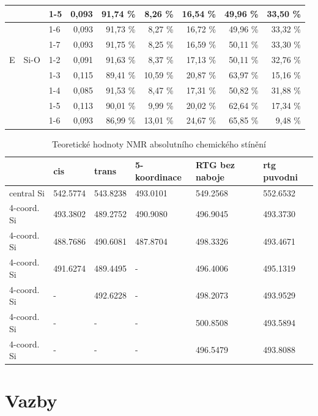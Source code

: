 \documentclass[
  digital, %
  table,   %
  lof,     %
  lot,     %
  oneside,
]{fithesis3}
\begin{document}
\begin{table}[htbp]
\begin{center}
\begin{tabular}{|l|l|l|r|r|r|r|r|r|}
 &  & 1-5  & 0,093 & 91,74 \% & 8,26 \% & 16,54 \% & 49,96 \% & 33,50 \% \\ \hline
 &  & 1-6 & 0,093 & 91,73 \% & 8,27 \% & 16,72 \% & 49,96 \% & 33,32 \% \\ \hline
 &  & 1-7 & 0,093 & 91,75 \% & 8,25 \% & 16,59 \% & 50,11 \% & 33,30 \% \\ \hline
E & Si-O & 1-2  & 0,091 & 91,63 \% & 8,37 \% & 17,13 \% & 50,11 \% & 32,76 \% \\ \hline
 &  & 1-3  & 0,115 & 89,41 \% & 10,59 \% & 20,87 \% & 63,97 \% & 15,16 \% \\ \hline
 &  & 1-4  & 0,085 & 91,53 \% & 8,47 \% & 17,31 \% & 50,82 \% & 31,88 \% \\ \hline
 &  & 1-5  & 0,113 & 90,01 \% & 9,99 \% & 20,02 \% & 62,64 \% & 17,34 \% \\ \hline
 &  & 1-6 & 0,093 & 86,99 \% & 13,01 \% & 24,67 \% & 65,85 \% & 9,48 \% \\ \hline
\end{tabular}
\end{center}
\label{nbo_large}
\end{table}

\begin{table}[htbp]
\caption{Teoretické hodnoty NMR absolutního chemického stínění}
\begin{center}
\begin{tabular}{|l|l|l|l|l|l|}
\hline
 & cis & trans & 5-koordinace & RTG bez naboje & rtg puvodni \\ \hline
central Si & 542.5774 & 543.8238 & 493.0101 & 549.2568 & 552.6532 \\ \hline
4-coord. Si & 493.3802 & 489.2752 & 490.9080 & 496.9045 & 493.3730 \\ \hline
4-coord. Si & 488.7686 & 490.6081 & 487.8704 & 498.3326 & 493.4671 \\ \hline
4-coord. Si & 491.6274 & 489.4495 & - & 496.4006 & 495.1319 \\ \hline
4-coord. Si & - & 492.6228 & - & 498.2073 & 493.9529 \\ \hline
4-coord. Si & - & - & - & 500.8508 & 493.5894 \\ \hline
4-coord. Si & -  & - & - & 496.5479 & 493.8088 \\ \hline
\end{tabular}
\end{center}
\label{nmr_large}
\end{table}



\section{Vazby}
\end{document}
